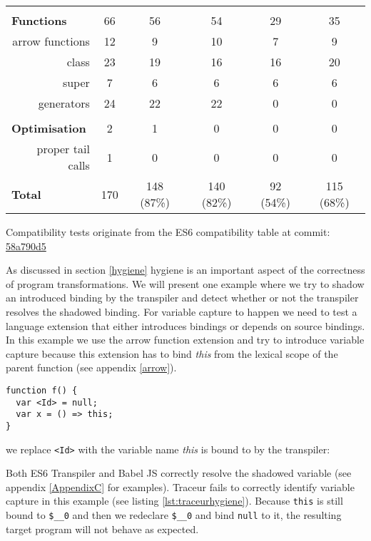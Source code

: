 \begin{table}[h]
{\begin{tabular}{@{}lccccc@{}}
\multicolumn{6}{c}{} \\

{\bf Functions}                     & 66 & 56 & 54 & 29 & 35 \\
\multicolumn{1}{r}{arrow functions} & 12 & 9 & 10 & 7 & 9 \\
\multicolumn{1}{r}{class}           & 23 & 19 & 16 & 16 & 20 \\
\multicolumn{1}{r}{super}           & 7 & 6 & 6 & 6 & 6 \\
\multicolumn{1}{r}{generators}      & 24 & 22 & 22 & 0 & 0 \\

\multicolumn{6}{c}{} \\

{\bf Optimisation}    & 2 & 1 & 0 & 0 & 0                               
\\
\multicolumn{1}{r}{proper tail calls} 2 & 1 & 0 & 0 & 0 & 0 \\

{\bf Total} & 170 & 148 (87\%) & 140 (82\%) & 92 (54\%) & 115 (68\%) \\ \bottomrule
\end{tabular}
}
Compatibility tests originate from the ES6 compatibility table at commit: \href{https://github.com/kangax/compat-table/tree/58a790d5b9d4366ea43f75ece7e7f869096227d5}{58a790d5} 
\end{table}

As discussed in section \ref{hygiene} hygiene is an important aspect of the correctness of program transformations. We will present one example where we try to shadow an introduced binding by the transpiler and detect whether or not the transpiler resolves the shadowed binding. For variable capture to happen we need to test a language extension that either introduces bindings or depends on source bindings. In this example we use the arrow function extension and try to introduce variable capture because this extension has to bind \textit{this} from the lexical scope of the parent function (see appendix \ref{arrow}).

\begin{lstlisting}[label=traceur-capture, caption=Example input to Traceur\protect\footnotemark]
function f() {
  var <Id> = null;
  var x = () => this;
}
\end{lstlisting}

we replace \lstinline$<Id>$ with the variable name \textit{this} is bound to by the transpiler:

Both ES6 Transpiler and Babel JS correctly resolve the shadowed variable (see appendix \ref{AppendixC} for examples). Traceur fails to correctly identify variable capture in this example (see listing \ref{lst:traceurhygiene}). Because \lstinline$this$ is still bound to \lstinline{$__0} and then we redeclare \lstinline{$__0} and bind \lstinline$null$ to it, the resulting target program will not behave as expected.

